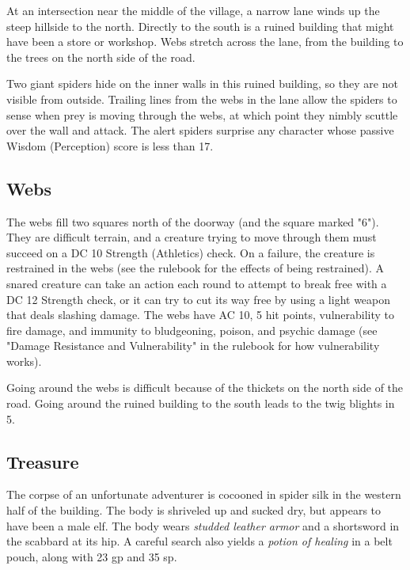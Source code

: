 \documentclass[10pt,a4paper,twoside,bg=print,twocolumn,openany,nodeprecatedcode]{dndbook}
\begin{document}
\begin{DndReadAloud}{}
At an intersection near the middle of the village, a narrow lane winds up the steep hillside to the north. Directly to the south is a ruined building that might have been a store or workshop. Webs stretch across the lane, from the building to the trees on the north side of the road.

\end{DndReadAloud}

Two giant spiders hide on the inner walls in this ruined building, so they are not visible from outside. Trailing lines from the webs in the lane allow the spiders to sense when prey is moving through the webs, at which point they nimbly scuttle over the wall and attack. The alert spiders surprise any character whose passive Wisdom (Perception) score is less than 17.

\subsection{Webs}
The webs fill two squares north of the doorway (and the square marked "6"). They are difficult terrain, and a creature trying to move through them must succeed on a DC 10 Strength (Athletics) check. On a failure, the creature is restrained in the webs (see the rulebook for the effects of being restrained). A snared creature can take an action each round to attempt to break free with a DC 12 Strength check, or it can try to cut its way free by using a light weapon that deals slashing damage. The webs have AC 10, 5 hit points, vulnerability to fire damage, and immunity to bludgeoning, poison, and psychic damage (see "Damage Resistance and Vulnerability" in the rulebook for how vulnerability works).

Going around the webs is difficult because of the thickets on the north side of the road. Going around the ruined building to the south leads to the twig blights in 5.

\subsection{Treasure}
The corpse of an unfortunate adventurer is cocooned in spider silk in the western half of the building. The body is shriveled up and sucked dry, but appears to have been a male elf. The body wears \textit{studded leather armor} and a shortsword in the scabbard at its hip. A careful search also yields a \textit{potion of healing} in a belt pouch, along with 23 gp and 35 sp.
\end{document}
